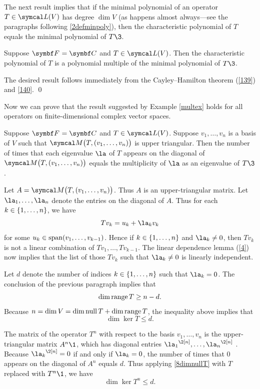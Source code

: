 The next result implies that if the minimal polynomial of an operator $T \in \L(V)$ has degree $\dim V$ (as happens almost always---see the paragraphs following \ref{2defminpoly}), then the characteristic polynomial of $T$ equals the minimal polynomial of $T\3$.

{Suppose $\F{} = \C{}$ and $T \in \L(V)$. Then the characteristic polynomial of $T$ is a polynomial multiple of the minimal polynomial of $T\3$.}

\proof
The desired result follows immediately from the Cayley--Hamilton theorem (\ref{139}) and \ref{140}.
\qed

Now we can prove that the result suggested by Example \ref{multex} holds for all operators on finite-dimensional complex vector spaces.

{Suppose $\F{} = \C{}$ and $T \in \L(V)$. Suppose $v_1, \ldots, v_n$ is a basis of $V$ such that
$\M\paren[\big]{T, (v_1, \ldots, v_n)}$ is upper triangular. Then the number of times that each eigenvalue $\la$ of $T$ appears on the diagonal of $\M\paren[\big]{T, (v_1, \ldots, v_n)}$ equals the multiplicity of $\la$ as an eigenvalue of $T\3$.}

\proof
Let $A = \M\paren[\big]{T, (v_1, \ldots, v_n)}$. Thus $A$ is an upper-triangular matrix. Let $\la_1, \ldots, \la_n$ denote the entries on the diagonal of $A$. Thus for each $k \in \{1, \ldots, n\}$, we have
\[
Tv_k = u_k + \la_k v_k
\]
for some $u_k \in \operatorname{span}(v_1, \ldots, v_{k-1})$. Hence if $k \in \{1, \ldots, n\}$ and $\la_k \ne 0$, then $Tv_k$ is not a linear combination of $Tv_1, \ldots, Tv_{k-1}$. The linear dependence lemma (\ref{4}) now implies that the list of those $Tv_k$ such that $\la_k \ne 0$ is linearly independent.

Let $d$ denote the number of indices $k \in \{1, \ldots, n\}$ such that $\la_k = 0$. The conclusion of the previous paragraph implies that
\[
\dim \operatorname{range} T \ge n - d.
\]
Because $n = \dim V = \dim \operatorname{null} T + \dim \operatorname{range} T$, the inequality above implies that
\begin{equation} \label{8dimnullT}
\dim \ker T \le d.
\end{equation}%

The matrix of the operator $T^n$ with respect to the basis $v_1, \ldots, v_n$ is the upper-triangular matrix $A^n\1$, which has diagonal entries
${\la_1}^{\2[n]}, \ldots, {\la_n}^{\2[n]}$ . Because ${\la_k}^{\2[n]} = 0$ if and only if
$\la_k = 0$, the number of times that $0$ appears on the diagonal of $A^n$ equals $d$. Thus applying \ref{8dimnullT} with $T$ replaced with $T^n\1$, we have
\begin{equation} \label{8dimnullTn}
\dim \ker T^n \le d.
\end{equation}%

